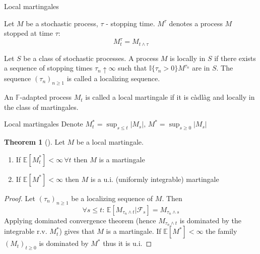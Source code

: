 \documentclass{beamer}%
\theoremstyle{definition}
\newtheorem{mytheor}[theorem]{Theorem}
\newcommand{\E}{\mathbb{E}}
\newcommand{\F}{\mathcal{F}}
\begin{document}
    

\begin{frame}{Local martingales}
    \begin{definition}
        Let $M$ be a stochastic process, $\tau$ - stopping time. $M^\tau$ denotes a process $M$ stopped at time $\tau$:
        \begin{equation*}
            M^{\tau}_t = M_{t \wedge \tau}
        \end{equation*}
    \end{definition}
    \begin{definition}
        Let $S$ be a class of stochastic processes. A process $M$ is locally in $S$ if there exists a sequence of stopping times $\tau_n \uparrow \infty$ such that $\mathbb{I} \{\tau_n > 0\} M^{\tau_n}$ are in $S$. The sequence $(\tau_n)_{n \geq 1}$ is called a localizing sequence.
    \end{definition}
    \begin{definition}
       An $\mathbb{F}$-adapted process $M_t$ is called a local martingale if it is càdlàg and locally in the class of martingales.
    \end{definition}
\end{frame}
\begin{frame}{Local martingales}
Denote $M_t^* = \sup_{s \leq t} |M_s|, \, M^* = \sup_{s \geq 0} |M_s|$
    \begin{mytheor}[]
        Let $M$ be a local martingale.
        \begin{enumerate}
            \item If $\E [M_t^*] < \infty \, \forall t$ then $M$ is a martingale
            \item If $\E [M^*] < \infty$ then $M$ is a u.i. (uniformly integrable) martingale
        \end{enumerate}
    \end{mytheor}
    \begin{proof}[Proof]
        Let $(\tau_n)_{n \geq 1}$ be a localizing sequence of $M$. Then 
        $$
            \forall s \leq t: \, \E[M_{\tau_n \wedge t} | \F_s] = M_{\tau_n \wedge s}
            $$
        Applying dominated convergence theorem (hence $M_{\tau_n \wedge t}$ is dominated by the integrable r.v. $M^*_t$) gives that $M$ is a martingale. If $\E [M^*] < \infty$ the family $(M_t)_{t \geq 0}$ is dominated by $M^*$ thus it is u.i.
    \end{proof}
\end{frame}
\end{document}
